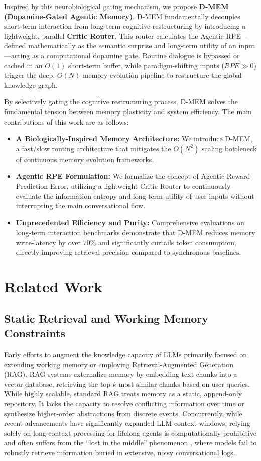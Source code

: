 \documentclass{article}
\begin{document}
Inspired by this neurobiological gating mechanism, we propose \textbf{D-MEM (Dopamine-Gated Agentic Memory)}. D-MEM fundamentally decouples short-term interaction from long-term cognitive restructuring by introducing a lightweight, parallel \textbf{Critic Router}. This router calculates the Agentic RPE---defined mathematically as the semantic surprise and long-term utility of an input---acting as a computational dopamine gate. Routine dialogue is bypassed or cached in an $O(1)$ short-term buffer, while paradigm-shifting inputs ($RPE \gg 0$) trigger the deep, $O(N)$ memory evolution pipeline to restructure the global knowledge graph.

By selectively gating the cognitive restructuring process, D-MEM solves the fundamental tension between memory plasticity and system efficiency. The main contributions of this work are as follows:
\begin{itemize}
    \item \textbf{A Biologically-Inspired Memory Architecture:} We introduce D-MEM, a fast/slow routing architecture that mitigates the $O(N^2)$ scaling bottleneck of continuous memory evolution frameworks.
    \item \textbf{Agentic RPE Formulation:} We formalize the concept of Agentic Reward Prediction Error, utilizing a lightweight Critic Router to continuously evaluate the information entropy and long-term utility of user inputs without interrupting the main conversational flow.
    \item \textbf{Unprecedented Efficiency and Purity:} Comprehensive evaluations on long-term interaction benchmarks demonstrate that D-MEM reduces memory write-latency by over 70\% and significantly curtails token consumption, directly improving retrieval precision compared to synchronous baselines.
\end{itemize}

\section{Related Work}

\subsection{Static Retrieval and Working Memory Constraints}
Early efforts to augment the knowledge capacity of LLMs primarily focused on extending working memory or employing Retrieval-Augmented Generation (RAG). RAG systems \citep{lewis2020retrieval} externalize memory by embedding text chunks into a vector database, retrieving the top-$k$ most similar chunks based on user queries. While highly scalable, standard RAG treats memory as a static, append-only repository. It lacks the capacity to resolve conflicting information over time or synthesize higher-order abstractions from discrete events. Concurrently, while recent advancements have significantly expanded LLM context windows, relying solely on long-context processing for lifelong agents is computationally prohibitive and often suffers from the ``lost in the middle'' phenomenon \citep{liu2023lost}, where models fail to robustly retrieve information buried in extensive, noisy conversational logs.
\end{document}
